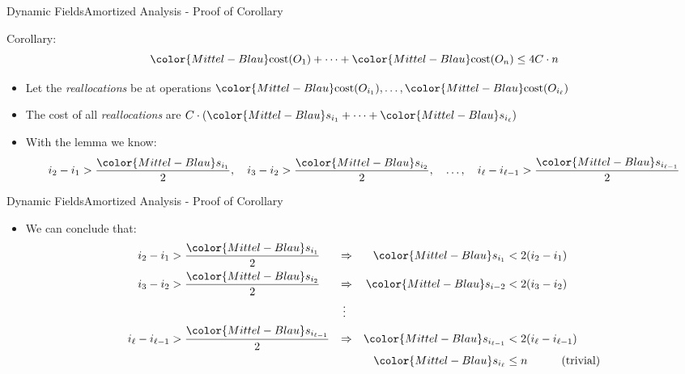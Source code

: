 \begin{frame}{Dynamic Fields}{Amortized Analysis - Proof of Corollary}
  \begin{block}{Corollary:}
    \begin{displaymath}
      {\color{Mittel-Blau}\mathrm{cost}(O_1)}+\dots+
      {\color{Mittel-Blau}\mathrm{cost}(O_n)} \leq 4 C \cdot n
    \end{displaymath}
  \end{block}
  \begin{itemize}
    \item
      Let the \textit{reallocations} be at operations
      \begin{math}
        {\color{Mittel-Blau}\mathrm{cost}(O_{i_1})},\dots,
        {\color{Mittel-Blau}\mathrm{cost}(O_{i_\ell})}
      \end{math}
    \item
      The {\color{Mittel-Blau}cost} of all \textit{reallocations} are
      \begin{math}
        C \cdot \left(
          {\color{Mittel-Blau}s_{i_1}}+\dots+{\color{Mittel-Blau}s_{i_\ell}}
        \right)
      \end{math}
    \item
      With the lemma we know:
      \begin{displaymath}
        i_2-i_1 > \frac{\color{Mittel-Blau}s_{i_1}}{2},\hspace{1.0em}
        i_3-i_2 > \frac{\color{Mittel-Blau}s_{i_2}}{2},\hspace{1.0em}
        \dotsc,\hspace{1.0em}
        i_\ell-i_{\ell-1} > \frac{\color{Mittel-Blau}s_{i_{\ell-1}}}{2}
      \end{displaymath}
  \end{itemize}
\end{frame}


\begin{frame}{Dynamic Fields}{Amortized Analysis - Proof of Corollary}
  \begin{itemize}
    \item
      We can conclude that:
      \begin{align*}
        i_2-i_1 &> \frac{\color{Mittel-Blau}s_{i_1}}{2} &
        \Rightarrow &&
        {\color{Mittel-Blau}s_{i_1}} &< 2 (i_2 - i_1)\\
        i_3-i_2 &> \frac{\color{Mittel-Blau}s_{i_2}}{2} &
        \Rightarrow &&
        {\color{Mittel-Blau}s_{i-2}} &< 2 (i_3 - i_2)\\
        {} & {} & \vdots\;\;\\
        i_\ell-i_{\ell-1} &> \frac{\color{Mittel-Blau}s_{i_{\ell-1}}}{2} &
        \Rightarrow &&
        {\color{Mittel-Blau}s_{i_{\ell-1}}} &< 2 (i_\ell - i_{\ell-1})\\
        {} & {} & {} &&
        {\color{Mittel-Blau}s_{i_\ell}} &\leq n
        \hspace*{3.0em}\text{(trivial)}
      \end{align*}
  \end{itemize}
\end{frame}


